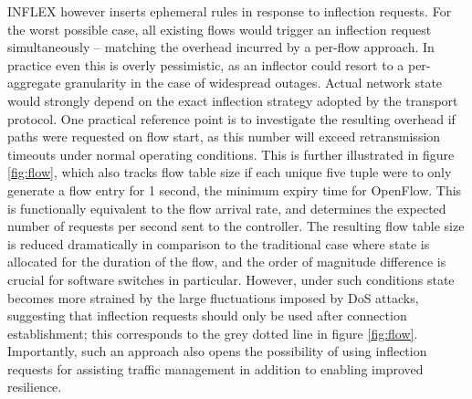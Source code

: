 INFLEX however inserts ephemeral rules in response to inflection requests.
For the worst possible case, all existing flows would trigger an inflection request simultaneously -- matching the overhead incurred by a per-flow approach.
In practice even this is overly pessimistic, as an inflector could resort to a per-aggregate granularity in the case of widespread outages.
Actual network state would strongly depend on the exact inflection strategy adopted by the transport protocol.
One practical reference point is to investigate the resulting overhead if paths were requested on flow start, as this number will exceed retransmission timeouts under normal operating conditions.
This is further illustrated in figure \ref{fig:flow}, which also tracks flow table size if each unique five tuple were to only generate a flow entry for 1 second, the minimum expiry time for OpenFlow.
This is functionally equivalent to the flow arrival rate, and determines the expected number of requests per second sent to the controller.
The resulting flow table size is reduced dramatically in comparison to the traditional case where state is allocated for the duration of the flow, and the order of magnitude difference is crucial for software switches in particular.
However, under such conditions state becomes more strained by the large fluctuations imposed by \ac{DoS} attacks, suggesting that inflection requests should only be used after connection establishment; this corresponds to the grey dotted line in figure \ref{fig:flow}. Importantly, such an approach also opens the possibility of using inflection requests for assisting traffic management in addition to enabling improved resilience.


